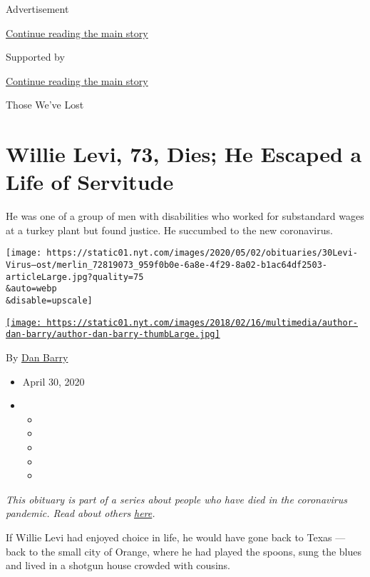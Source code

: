 Advertisement

\protect\hyperlink{after-top}{Continue reading the main story}

Supported by

\protect\hyperlink{after-sponsor}{Continue reading the main story}

Those We've Lost

\hypertarget{willie-levi-73-dies-he-escaped-a-life-of-servitude}{%
\section{Willie Levi, 73, Dies; He Escaped a Life of
Servitude}\label{willie-levi-73-dies-he-escaped-a-life-of-servitude}}

He was one of a group of men with disabilities who worked for
substandard wages at a turkey plant but found justice. He succumbed to
the new coronavirus.

\texttt{[image: https://static01.nyt.com/images/2020/05/02/obituaries/30Levi-Virus--ost/merlin\_72819073\_959f0b0e-6a8e-4f29-8a02-b1ac64df2503-articleLarge.jpg?quality=75\\\&auto=webp\\\&disable=upscale]}

\href{https://www.nytimes.com/by/dan-barry}{\texttt{[image: https://static01.nyt.com/images/2018/02/16/multimedia/author-dan-barry/author-dan-barry-thumbLarge.jpg]}}

By \href{https://www.nytimes.com/by/dan-barry}{Dan Barry}

\begin{itemize}
\item
  April 30, 2020
\item
  \begin{itemize}
  \item
  \item
  \item
  \item
  \item
  \end{itemize}
\end{itemize}

\emph{This obituary is part of a series about people who have died in
the coronavirus pandemic. Read about others}
\href{https://www.nytimes.com/series/people-who-have-died-of-the-coronavirus}{\emph{here}}\emph{.}

If Willie Levi had enjoyed choice in life, he would have gone back to
Texas --- back to the small city of Orange, where he had played the
spoons, sung the blues and lived in a shotgun house crowded with
cousins.

